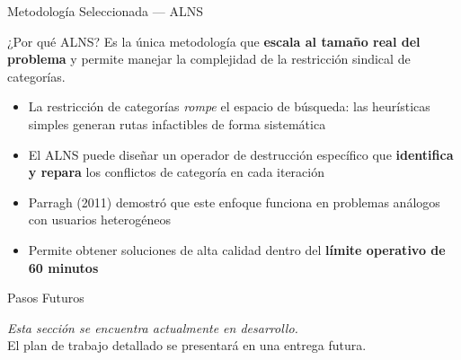 \documentclass[10pt, aspectratio=169]{beamer}
\begin{document}
\begin{frame}{Metodología Seleccionada — ALNS}

  \begin{block}{¿Por qué ALNS?}
    Es la única metodología que \textbf{escala al tamaño real del problema} y permite manejar la complejidad de la restricción sindical de categorías.
  \end{block}

  \vspace{8pt}
  \begin{itemize}\setlength\itemsep{9pt}
    \item La restricción de categorías \textit{rompe} el espacio de búsqueda: las heurísticas simples generan rutas infactibles de forma sistemática
    \item El ALNS puede diseñar un operador de destrucción específico que \textbf{identifica y repara} los conflictos de categoría en cada iteración
    \item Parragh (2011) demostró que este enfoque funciona en problemas análogos con usuarios heterogéneos
    \item Permite obtener soluciones de alta calidad dentro del \textbf{límite operativo de 60 minutos}
  \end{itemize}

\end{frame}

\begin{frame}{Pasos Futuros}

  \vspace{20pt}
  \begin{block}{}
    \centering
    \vspace{8pt}
    \textit{Esta sección se encuentra actualmente en desarrollo.}\\[4pt]
    El plan de trabajo detallado se presentará en una entrega futura.
    \vspace{8pt}
  \end{block}

\end{frame}
\end{document}
